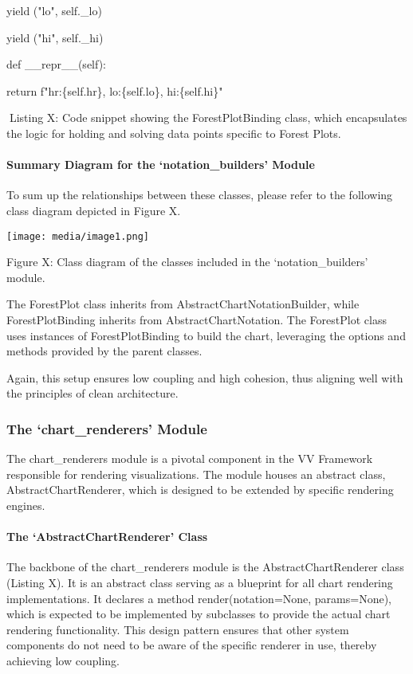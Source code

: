 \documentclass[
]{article}
\begin{document}
yield ("lo", self.\_lo)

yield ("hi", self.\_hi)

def \_\_repr\_\_(self):

return f"hr:\{self.hr\}, lo:\{self.lo\}, hi:\{self.hi\}"

Listing X: Code snippet showing the ForestPlotBinding class, which
encapsulates the logic for holding and solving data points specific to
Forest Plots.

\paragraph{Summary Diagram for the `notation\_builders'
Module}\label{summary-diagram-for-the-notation_builders-module}

To sum up the relationships between these classes, please refer to the
following class diagram depicted in Figure X.

\texttt{[image: media/image1.png]}

Figure X: Class diagram of the classes included in the
`notation\_builders' module.

The ForestPlot class inherits from AbstractChartNotationBuilder, while
ForestPlotBinding inherits from AbstractChartNotation. The ForestPlot
class uses instances of ForestPlotBinding to build the chart, leveraging
the options and methods provided by the parent classes.

Again, this setup ensures low coupling and high cohesion, thus aligning
well with the principles of clean architecture.

\subsubsection{The `chart\_renderers'
Module}\label{the-chart_renderers-module}

The chart\_renderers module is a pivotal component in the VV Framework
responsible for rendering visualizations. The module houses an abstract
class, AbstractChartRenderer, which is designed to be extended by
specific rendering engines.

\paragraph{The `AbstractChartRenderer'
Class}\label{the-abstractchartrenderer-class}

The backbone of the chart\_renderers module is the AbstractChartRenderer
class (Listing X). It is an abstract class serving as a blueprint for
all chart rendering implementations. It declares a method
render(notation=None, params=None), which is expected to be implemented
by subclasses to provide the actual chart rendering functionality. This
design pattern ensures that other system components do not need to be
aware of the specific renderer in use, thereby achieving low coupling.
\end{document}
